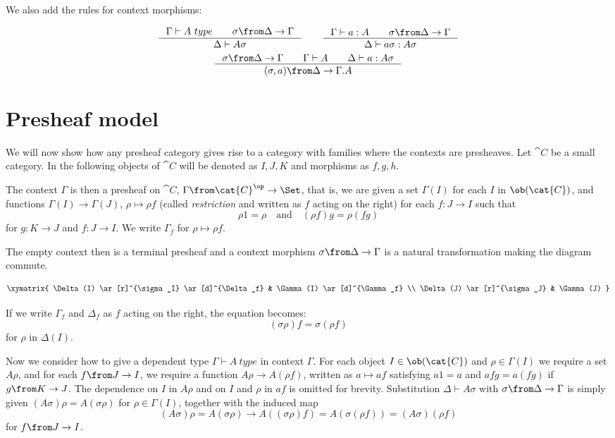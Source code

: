 We also add the rules for context morphisms:

\[
  \inference{\Gamma \vdash A~type \qquad \sigma \from \Delta \to \Gamma}{\Delta \vdash A\sigma} \qquad
  \inference{\Gamma \vdash a : A \qquad \sigma \from \Delta \to \Gamma}{\Delta \vdash a\sigma : A\sigma}
\]
\[
  \inference{\sigma \from \Delta \to \Gamma \qquad \Gamma \vdash A \qquad \Delta \vdash a : A\sigma}{(\sigma, a) \from \Delta \to \Gamma.A}
\]

\section*{Presheaf model}

We will now show how any presheaf category gives rise to a category with
families where the contexts are presheaves.  Let $\cat{C}$ be a small category.
In the following objects of $\cat{C}$ will be denoted as $I,J,K$ and morphisms
as $f,g,h$.

The context $\Gamma$ is then a presheaf on $\cat{C}$, $\Gamma \from
\cat{C}^\op \to \Set$, that is, we are given a set $\Gamma(I)$ for each
$I$ in $\ob(\cat{C})$, and functions $\Gamma(I) \to \Gamma(J)$, $\rho \mapsto \rho
f$ (called \emph{restriction} and written as $f$ acting on the right) for each
$f: J \to I$ such that
\[
  \rho 1 = \rho \quad \text{and} \quad (\rho f) g = \rho (f g)
\]
for $g: K \to J$ and $f: J \to I$. We write $\Gamma_f$ for $\rho \mapsto \rho
f$.

The empty context then is a terminal presheaf and a context morphism $\sigma
\from \Delta \to \Gamma$ is a natural transformation making the diagram
commute.

\[
  \xymatrix{
    \Delta(I) \ar[r]^{\sigma_I} \ar[d]^{\Delta_f} & \Gamma(I) \ar[d]^{\Gamma_f} \\
    \Delta(J) \ar[r]^{\sigma_J} & \Gamma(J)
  }
\]

If we write $\Gamma_f$ and $\Delta_f$ as $f$ acting on the right, the
equation becomes:
\[
  (\sigma \rho) f = \sigma (\rho f)
\]
for $\rho$ in $\Delta(I)$.

Now we consider how to give a dependent type $\Gamma \vdash A~type$ in context
$\Gamma$. For each object $I \in \ob(\cat{C})$ and $\rho \in \Gamma(I)$ we require a
set $A \rho$, and for each $f \from J \to I$, we require a function $A \rho \to
A (\rho f)$, written as $a \mapsto af$ satisfying $a1 = a$ and $afg = a (f g)$
if $g \from K \to J$. The dependence on $I$ in $A\rho$ and on $I$ and $\rho$ in
$af$ is omitted for brevity. Substitution $\Delta \vdash A \sigma$ with $\sigma
\from \Delta \to \Gamma$ is simply given $(A \sigma) \rho = A (\sigma \rho)$
for $\rho \in \Gamma(I)$, together with the induced map
\[
  (A\sigma)\rho = A (\sigma \rho) \to A ((\sigma \rho)f) = A (\sigma (\rho f)) = (A \sigma) (\rho f)
\]
for $f \from J \to I$.

